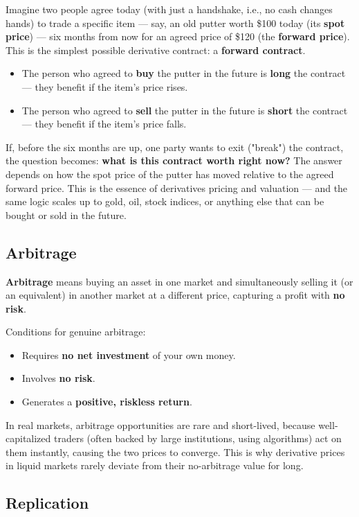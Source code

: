 \documentclass[12pt,openany]{book}
\theoremstyle{definition}
\theoremstyle{remark}
\begin{document}
Imagine two people agree today (with just a handshake, i.e., no cash changes hands) to trade a specific item — say, an old putter worth \$100 today (its \textbf{spot price}) — six months from now for an agreed price of \$120 (the \textbf{forward price}). This is the simplest possible derivative contract: a \textbf{forward contract}.

\begin{itemize}
\item The person who agreed to \textbf{buy} the putter in the future is \textbf{long} the contract — they benefit if the item's price rises.
\item The person who agreed to \textbf{sell} the putter in the future is \textbf{short} the contract — they benefit if the item's price falls.
\end{itemize}
If, before the six months are up, one party wants to exit ("break") the contract, the question becomes: \textbf{what is this contract worth right now?} The answer depends on how the spot price of the putter has moved relative to the agreed forward price. This is the essence of derivatives pricing and valuation — and the same logic scales up to gold, oil, stock indices, or anything else that can be bought or sold in the future.

\subsection{Arbitrage}

\textbf{Arbitrage} means buying an asset in one market and simultaneously selling it (or an equivalent) in another market at a different price, capturing a profit with \textbf{no risk}.

Conditions for genuine arbitrage:
\begin{itemize}
\item Requires \textbf{no net investment} of your own money.
\item Involves \textbf{no risk}.
\item Generates a \textbf{positive, riskless return}.
\end{itemize}
In real markets, arbitrage opportunities are rare and short-lived, because well-capitalized traders (often backed by large institutions, using algorithms) act on them instantly, causing the two prices to converge. This is why derivative prices in liquid markets rarely deviate from their no-arbitrage value for long.

\subsection{Replication}
\end{document}
